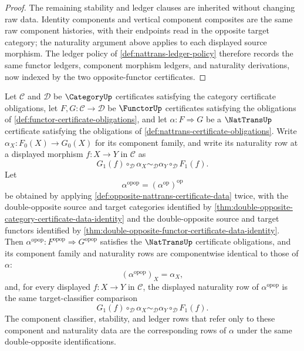 \begin{proof}
The remaining stability and ledger clauses are inherited without changing raw data. Identity components and vertical component composites are the same raw
component histories, with their endpoints read in the opposite target category; the naturality argument above applies to each displayed source morphism. The
ledger policy of \autoref{def:nattrans-ledger-policy} therefore records the same functor ledgers, component morphism ledgers, and naturality derivations,
now indexed by the two opposite-functor certificates.
\end{proof}

\begin{theorem}
\label{thm:double-opposite-nattrans-certificate-data-identity}
Let $\mathcal C$ and $\mathcal D$ be $\CategoryUp$ certificates satisfying the category certificate obligations, let $F,G:\mathcal C\to\mathcal D$ be $\FunctorUp$ certificates satisfying the obligations of \autoref{def:functor-certificate-obligations}, and let $\alpha:F\Rightarrow G$ be a $\NatTransUp$ certificate satisfying the obligations of \autoref{def:nattrans-certificate-obligations}. Write $\alpha_X:F_0(X)\to G_0(X)$ for its component family, and write its naturality row at a displayed morphism $f:X\to Y$ in $\mathcal C$ as
$$
G_1(f)\circ_{\mathcal D}\alpha_X
\sim_{\mathcal D}
\alpha_Y\circ_{\mathcal D}F_1(f).
$$
Let
$$
\alpha^{\mathrm{opop}}=(\alpha^{\mathrm{op}})^{\mathrm{op}}
$$
be obtained by applying \autoref{def:opposite-nattrans-certificate-data} twice, with the double-opposite source and target categories identified by \autoref{thm:double-opposite-category-certificate-data-identity} and the double-opposite source and target functors identified by \autoref{thm:double-opposite-functor-certificate-data-identity}. Then $\alpha^{\mathrm{opop}}:F^{\mathrm{opop}}\Rightarrow G^{\mathrm{opop}}$ satisfies the $\NatTransUp$ certificate obligations, and its component family and naturality rows are componentwise identical to those of $\alpha$:
$$
(\alpha^{\mathrm{opop}})_X=\alpha_X,
$$
and, for every displayed $f:X\to Y$ in $\mathcal C$, the displayed naturality row of $\alpha^{\mathrm{opop}}$ is the same target-classifier comparison
$$
G_1(f)\circ_{\mathcal D}\alpha_X
\sim_{\mathcal D}
\alpha_Y\circ_{\mathcal D}F_1(f).
$$
The component classifier, stability, and ledger rows that refer only to these component and naturality data are the corresponding rows of $\alpha$ under the same double-opposite identifications.
\end{theorem}
